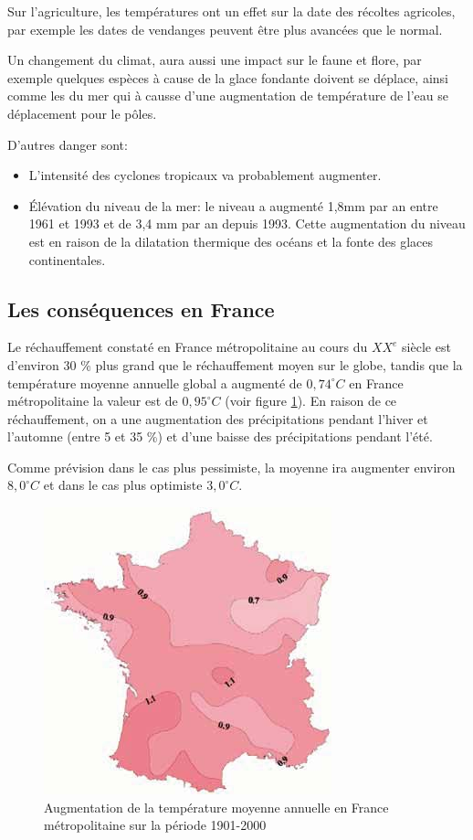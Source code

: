 \documentclass[a4paper,11pt]{article}
\begin{document}
Sur  l'agriculture, les  températures  ont un  effet  sur la  date des  récoltes
agricoles, par exemple les dates de vendanges peuvent être plus avancées que le normal.

Un  changement du  climat, aura  aussi une  impact sur  le faune  et  flore, par
exemple quelques espèces à cause de  la glace fondante doivent se déplace, ainsi
comme les  du mer  qui à causse  d'une augmentation  de température de  l'eau se
déplacement pour le pôles.

D'autres danger sont:
\begin{itemize}
\item L'intensité des cyclones tropicaux va probablement augmenter.
\item Élévation  du niveau de la  mer: le niveau  a augmenté 1,8mm par  an entre
  1961 et 1993 et de 3,4 mm par an depuis 1993. Cette augmentation du niveau est
  en raison de la dilatation thermique des océans et la fonte des glaces continentales.
\end{itemize}


\subsection{Les conséquences en France}


Le réchauffement constaté en France métropolitaine au cours du $XX^e$ siècle 
est d’environ 30  \% plus grand que le réchauffement moyen  sur le globe, tandis
que  la température  moyenne annuelle  global a  augmenté de  $0,74^{\circ}C$ en
France métropolitaine la valeur est de $0,95^{\circ}C$ (voir figure \ref{fig:franceMoyenne}).
En raison de ce réchauffement, on a une augmentation des précipitations
pendant l'hiver et l'automne (entre 5 et 35 \%) et d’une baisse des précipitations
pendant l'été.

Comme prévision dans le cas plus pessimiste,  la moyenne ira augmenter environ $8,0^{\circ}C$ et
dans le cas plus optimiste $3,0^{\circ}C$.

\begin{figure}[H]
  \begin{centering}
    \includegraphics[scale=0.6]{fig/franceMoyenne}
    \par\end{centering}
  \caption{Augmentation de la température moyenne annuelle en France
métropolitaine sur la période 1901-2000}
  \label{fig:franceMoyenne}
\end{figure}
\end{document}
